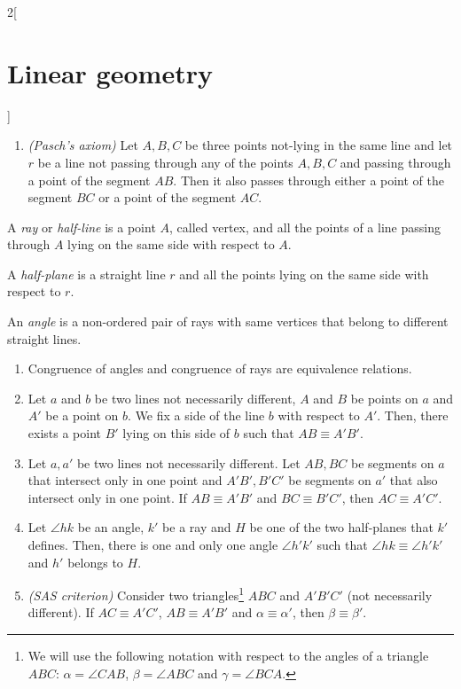 \documentclass[../../../main.tex]{subfiles}
\begin{document}
\begin{multicols}{2}[\section{Linear geometry}]
\begin{axiom}
\begin{enumerate}
            \item \textit{(Pasch's axiom)} Let $A,B,C$ be three points not-lying in the same line and let $r$ be a line not passing through any of the points $A,B,C$ and passing through a point of the segment $AB$. Then it also passes through either a point of the segment $BC$ or a point of the segment $AC$.
        \end{enumerate}
    \end{axiom}
    \begin{definition}
        A \textit{ray} or \textit{half-line} is a point $A$, called vertex, and all the points of a line passing through $A$ lying on the same side with respect to $A$.
    \end{definition}
    \begin{definition}
        A \textit{half-plane} is a straight line $r$ and all the points lying on the same side with respect to $r$.
    \end{definition}
    \begin{definition}
        An \textit{angle} is a non-ordered pair of rays with same vertices that belong to different straight lines.
    \end{definition}
    \begin{axiom}\label{LG_congruence}
        \hfill
        \begin{enumerate}
            \item Congruence of angles and congruence of rays are equivalence relations.
            \item Let $a$ and $b$ be two lines not necessarily different, $A$ and $B$ be points on $a$ and $A'$ be a point on $b$. We fix a side of the line $b$ with respect to $A'$. Then, there exists a point $B'$ lying on this side of $b$ such that $AB\equiv A'B'$.
            \item Let $a,a'$ be two lines not necessarily different. Let $AB,BC$ be segments on $a$ that intersect only in one point and $A'B',B'C'$ be segments on $a'$ that also intersect only in one point. If $AB\equiv A'B'$ and $BC\equiv B'C'$, then $AC\equiv A'C'$.
            \item Let $\angle hk$ be an angle, $k'$ be a ray and $H$ be one of the two half-planes that $k'$ defines. Then, there is one and only one angle $\angle h'k'$ such that $\angle hk\equiv\angle h'k'$ and $h'$ belongs to $H$.
            \item \textit{(SAS criterion)} Consider two triangles\footnote{We will use the following notation with respect to the angles of a triangle $ABC$: $\alpha=\angle CAB$, $\beta=\angle ABC$ and $\gamma=\angle BCA$.} $ABC$ and $A'B'C'$ (not necessarily different). If $AC\equiv A'C'$, $AB\equiv A'B'$ and $\alpha\equiv\alpha'$, then $\beta\equiv\beta'$.

\end{enumerate}
\end{axiom}
\end{multicols}
\end{document}
